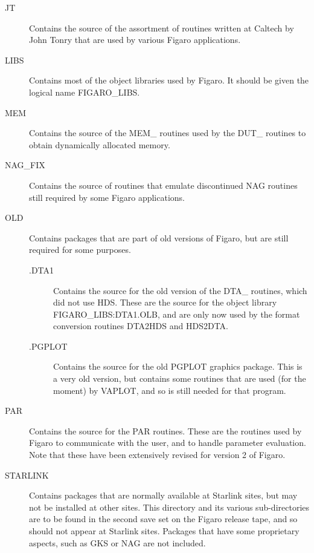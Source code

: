 \begin{description}
\item [JT] Contains the source of the assortment of routines written at 
Caltech by John Tonry that are used by various Figaro applications.

\item [LIBS] Contains most of the object libraries used by Figaro. It 
should be given the logical name FIGARO\_LIBS.

\item [MEM] Contains the source of the MEM\_ routines used by the DUT\_ 
routines to obtain dynamically allocated memory.

\item [NAG\_FIX] Contains the source of routines that emulate discontinued NAG 
routines still required by some Figaro applications.

\item [OLD] Contains packages that are part of old versions of Figaro, but are
still required for some purposes.

\begin {description}

\item [.DTA1] Contains the source for the old version of the DTA\_ routines,
which did not use HDS. These are the source  for  the  object 
library FIGARO\_LIBS:DTA1.OLB, and are only now used by the format conversion
routines DTA2HDS and HDS2DTA.

\item [.PGPLOT] Contains the source for the old PGPLOT graphics package. 
This is a very old version, but contains some routines that are used (for 
the moment) by VAPLOT, and so is still needed for that program.

\end{description}
    
\item [PAR] Contains the source for the PAR routines. These are the routines
used by Figaro to communicate with the user, and to handle parameter
evaluation. Note that these have been extensively revised for version 2 of
Figaro.

\item [STARLINK] Contains packages that are normally available at 
Starlink sites, but may not be installed at other sites. This directory 
and its various sub-directories are to be found in the second save set
on the Figaro release tape, and so should not appear at Starlink sites. 
Packages that have some proprietary aspects, such as GKS or NAG are not
included.


\end{description}
